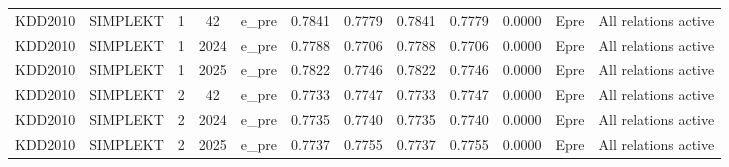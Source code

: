 \begin{table}[h]
\begin{tabular}{llcclcccccl}
KDD2010 & SIMPLEKT & 1 & 42 & e_pre & 0.7841 & 0.7779 & 0.7841 & 0.7779 & 0.0000 & Epre & All relations active \\
KDD2010 & SIMPLEKT & 1 & 2024 & e_pre & 0.7788 & 0.7706 & 0.7788 & 0.7706 & 0.0000 & Epre & All relations active \\
KDD2010 & SIMPLEKT & 1 & 2025 & e_pre & 0.7822 & 0.7746 & 0.7822 & 0.7746 & 0.0000 & Epre & All relations active \\
KDD2010 & SIMPLEKT & 2 & 42 & e_pre & 0.7733 & 0.7747 & 0.7733 & 0.7747 & 0.0000 & Epre & All relations active \\
KDD2010 & SIMPLEKT & 2 & 2024 & e_pre & 0.7735 & 0.7740 & 0.7735 & 0.7740 & 0.0000 & Epre & All relations active \\
KDD2010 & SIMPLEKT & 2 & 2025 & e_pre & 0.7737 & 0.7755 & 0.7737 & 0.7755 & 0.0000 & Epre & All relations active \\
\bottomrule
\end{tabular}
\end{table}
